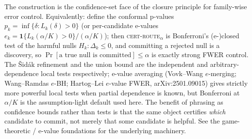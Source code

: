 \begin{remark}\label{rem:closure}
The construction is the confidence-set face of the closure principle for family-wise error
control. Equivalently: define the conformal p-values $p_k=\inf\{\delta:L_k(\delta)>0\}$ (or
per-candidate e-values $e_k=\mathbf 1\{L_k(\alpha/K)>0\}/(\alpha/K)$); then
\textsc{cert-route}$_\alpha$ is Bonferroni's (e-)closed test of the harmful nulls
$H_k:\Delta_k\le0$, and committing a rejected null is a discovery, so
$\Pr[\text{a true null is committed}]\le\alpha$ is exactly strong FWER control. The
\v Sid\'ak refinement and the union bound are the independent and arbitrary-dependence local
tests respectively; e-value averaging (Vovk--Wang $e$-merging; Wang--Ramdas $e$-BH; Hartog--Lei
$e$-value FWER, arXiv:2501.09015) gives strictly more powerful local tests when partial
dependence is known, but Bonferroni at $\alpha/K$ is the assumption-light default used here.
The benefit of phrasing as confidence bounds rather than tests is that the same object
certifies \emph{which} candidate to commit, not merely that some candidate is helpful.
See the game-theoretic / e-value foundations \cite{ramdas2023,vovk2005algorithmic} for the
underlying machinery.
\end{remark}
